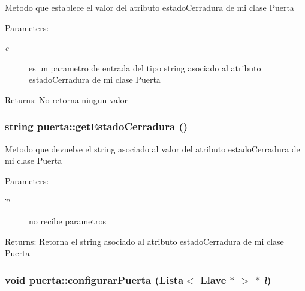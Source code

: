 Metodo que establece el valor del atributo estadoCerradura de mi clase Puerta \begin{Desc}
\item[Parameters:]
\begin{description}
\item[{\em e}]es un parametro de entrada del tipo string asociado al atributo estadoCerradura de mi clase Puerta \end{description}
\end{Desc}
\begin{Desc}
\item[Returns:]No retorna ningun valor \end{Desc}
\hypertarget{classpuerta_3c87fcb19f24d5348db587f0c6a9b27d}{
\subsubsection[getEstadoCerradura]{\setlength{\rightskip}{0pt plus 5cm}string puerta::getEstadoCerradura ()}}
\label{classpuerta_3c87fcb19f24d5348db587f0c6a9b27d}


Metodo que devuelve el string asociado al valor del atributo estadoCerradura de mi clase Puerta \begin{Desc}
\item[Parameters:]
\begin{description}
\item[{\em \char`\"{}\char`\"{}}]no recibe parametros \end{description}
\end{Desc}
\begin{Desc}
\item[Returns:]Retorna el string asociado al atributo estadoCerradura de mi clase Puerta \end{Desc}
\hypertarget{classpuerta_fc919a28f4751159e5109ec43e691e0e}{
\subsubsection[configurarPuerta]{\setlength{\rightskip}{0pt plus 5cm}void puerta::configurarPuerta (Lista$<$ {\bf Llave} $\ast$ $>$ $\ast$ {\em l})}}
\label{classpuerta_fc919a28f4751159e5109ec43e691e0e}


